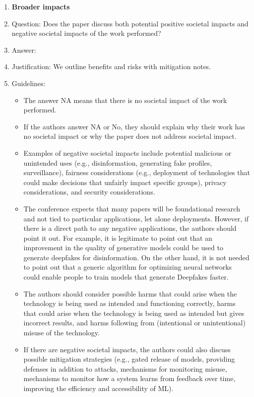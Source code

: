 \documentclass{article}
\begin{document}
\begin{enumerate}
\item {\bf Broader impacts}
    \item[] Question: Does the paper discuss both potential positive societal impacts and negative societal impacts of the work performed?
    \item[] Answer: \answerYes{}
    \item[] Justification: We outline benefits and risks with mitigation notes.
    \item[] Guidelines:
    \begin{itemize}
        \item The answer NA means that there is no societal impact of the work performed.
        \item If the authors answer NA or No, they should explain why their work has no societal impact or why the paper does not address societal impact.
        \item Examples of negative societal impacts include potential malicious or unintended uses (e.g., disinformation, generating fake profiles, surveillance), fairness considerations (e.g., deployment of technologies that could make decisions that unfairly impact specific groups), privacy considerations, and security considerations.
        \item The conference expects that many papers will be foundational research and not tied to particular applications, let alone deployments. However, if there is a direct path to any negative applications, the authors should point it out. For example, it is legitimate to point out that an improvement in the quality of generative models could be used to generate deepfakes for disinformation. On the other hand, it is not needed to point out that a generic algorithm for optimizing neural networks could enable people to train models that generate Deepfakes faster.
        \item The authors should consider possible harms that could arise when the technology is being used as intended and functioning correctly, harms that could arise when the technology is being used as intended but gives incorrect results, and harms following from (intentional or unintentional) misuse of the technology.
        \item If there are negative societal impacts, the authors could also discuss possible mitigation strategies (e.g., gated release of models, providing defenses in addition to attacks, mechanisms for monitoring misuse, mechanisms to monitor how a system learns from feedback over time, improving the efficiency and accessibility of ML).
    \end{itemize}
    

\end{enumerate}
\end{document}
